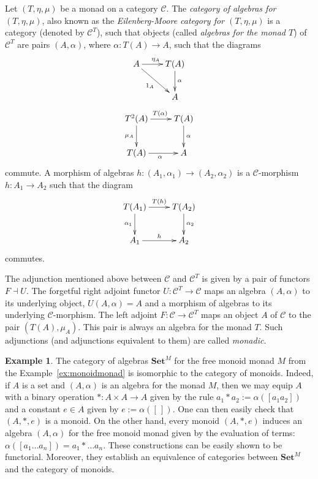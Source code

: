 \documentclass[reqno,A4paper]{amsart}
\newcommand{\C}{\mathcal{C}}
\newcommand{\Set}{\mathbf{Set}}
\newcommand{\isleftadjoint}{\dashv}
\theoremstyle{definition}
\newtheorem{example}[theorem]{Example}
\numberwithin{equation}{section}
\begin{document}
Let $(T,\eta,\mu)$ be a monad on a category $\C$.
The {\em category of algebras for $(T,\eta,\mu)$}, also known as the 
{\em Eilenberg-Moore category for $(T,\eta,\mu)$} is a category
(denoted by $\C^T$), such that  
objects (called {\em algebras for the monad $T$}) of $\C^T$ are pairs 
$(A,\alpha)$, where $\alpha:T(A)\to A$, such that the diagrams
\begin{equation}
\label{diag:algtriangle}
\xymatrix{
A \ar[r]^{\eta_A} \ar[rd]_{1_A} & T(A) \ar[d]^{\alpha} \\
 & A
}
\end{equation}
\begin{equation}
\label{diag:algsquare}
\xymatrix{
T^2(A) \ar[r]^{T(\alpha)} \ar[d]_{\mu_A} & T(A) \ar[d]^{\alpha}\\
T(A) \ar[r]_{\alpha} & A
}
\end{equation}
commute. A morphism of algebras 
$h:(A_1,\alpha_1)\to (A_2,\alpha_2)$ is a $\C$-morphism $h:A_1\to A_2$ such that
the diagram
\begin{equation}
\label{diag:algmorphism}
\xymatrix{
T(A_1) \ar[r]^{T(h)} \ar[d]_{\alpha_1}& T(A_2)\ar[d]^{\alpha_2}\\
A_1\ar[r]^{h}&A_2
}
\end{equation}
commutes.

The adjunction mentioned above between $\C$ and $\C^T$ is given by a pair of
functors $F\isleftadjoint U$. The forgetful right adjoint functor $U:\C^T\to\C$ maps an algebra
$(A,\alpha)$ to its underlying object, $U(A,\alpha)=A$ and a morphism of
algebras to its underlying $\C$-morphism. The left adjoint $F:\C\to\C^T$ maps
an object $A$ of $\C$ to the pair $(T(A),\mu_A)$. This pair is always an
algebra for the monad $T$. Such adjunctions (and adjunctions equivalent to them) 
are called {\em monadic}.

\begin{example}
The category of algebras $\Set^M$ for the free monoid monad $M$ from the 
Example~\ref{ex:monoidmonad} is isomorphic to the category of monoids. Indeed, if $A$ is a set and
$(A,\alpha)$ is an algebra for the monad $M$, then we may equip $A$ with a binary
operation $*:A\times A\to A$ given by the rule $a_1*a_2:=\alpha([a_1a_2])$ and a constant 
$e\in A$ given by $e:=\alpha([\,])$. One can then easily check that $(A,*,e)$ is a
monoid. On the other hand, every monoid $(A,*,e)$ induces an algebra $(A,\alpha)$ for the
free monoid monad given by the evaluation of terms: $\alpha([a_1\dots a_n])=a_1*\dots a_n$.
These constructions can be easily shown to be functorial. Moreover,
they establish an equivalence of categories 
between $\Set^M$ and the category of monoids.
\end{example}
\end{document}
